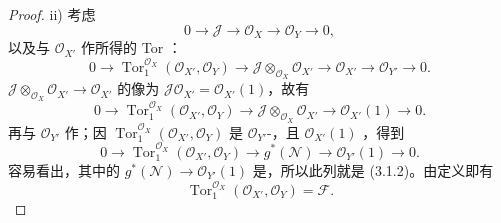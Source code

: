 \begin{proof}
ii) 考虑
\[
0\longrightarrow\mathcal J\longrightarrow\mathcal O_X\longrightarrow\mathcal O_Y\longrightarrow0,
\]
以及与 $\mathcal O_{X'}$ 作所得的 Tor ：
\[
0\longrightarrow\operatorname{Tor}^{\mathcal O_X}_1(\mathcal O_{X'},\mathcal O_Y)
\longrightarrow\mathcal J\otimes_{\mathcal O_X}\mathcal O_{X'}\longrightarrow\mathcal O_{X'}\longrightarrow\mathcal O_{Y'}\longrightarrow0.
\]
 $\mathcal J\otimes_{\mathcal O_X}\mathcal O_{X'}\to\mathcal O_{X'}$ 的像为 $\mathcal J\mathcal O_{X'}=\mathcal O_{X'}(1)$，故有
\[
0\longrightarrow\operatorname{Tor}^{\mathcal O_X}_1(\mathcal O_{X'},\mathcal O_Y)
\longrightarrow\mathcal J\otimes_{\mathcal O_X}\mathcal O_{X'}\longrightarrow\mathcal O_{X'}(1)\longrightarrow0.
\]
再与 $\mathcal O_{Y'}$ 作；因 $\operatorname{Tor}^{\mathcal O_X}_1(\mathcal O_{X'},\mathcal O_Y)$ 是 $\mathcal O_{Y'}$-，且 $\mathcal O_{X'}(1)$ ，得到
\[
0\longrightarrow\operatorname{Tor}^{\mathcal O_X}_1(\mathcal O_{X'},\mathcal O_Y)
\longrightarrow g^*(\mathcal N)\longrightarrow\mathcal O_{Y'}(1)\longrightarrow0.
\]
容易看出，其中的 $g^*(\mathcal N)\to\mathcal O_{Y'}(1)$ 是，所以此列就是 (3.1.2)。由定义即有
\[
\operatorname{Tor}^{\mathcal O_X}_1(\mathcal O_{X'},\mathcal O_Y)=\mathcal F.
\]
\end{proof}

